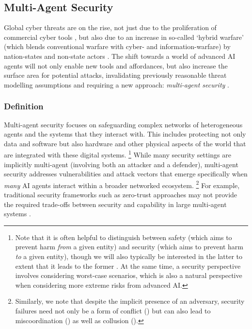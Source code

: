 \subsection{Multi-Agent Security}
\label{sec:multi-agent_security}

Global cyber threats are on the rise, not just due to the proliferation of commercial cyber tools \citep{nscs_threat_2023}, but also due to an increase in so-called `hybrid warfare' (which blends conventional warfare with cyber- and information-warfare) by nation-states and non-state actors \citep{kaunert_cyber-attacks_2021,csis_significant_2023}.
The shift towards a world of advanced AI agents will not only enable new tools and affordances, but also increase the surface area for potential attacks, invalidating previously reasonable threat modelling assumptions and requiring a new approach: \textit{multi-agent security} \citep{masec}.

\subsubsection{Definition}

Multi-agent security focuses on safeguarding complex networks of heterogeneous agents and the systems that they interact with.
This includes protecting not only data and software but also hardware and other physical aspects of the world that are integrated with these digital systems.%
\footnote{Note that it is often helpful to distinguish between safety (which aims to prevent harm \textit{from} a given entity) and security (which aims to prevent harm \textit{to} a given entity), though we will also typically be interested in the latter to extent that it leads to the former \citep{khlaaf2023}.
At the same time, a security perspective involves considering worst-case scenarios, which is also a natural perspective when considering more extreme risks from advanced AI.}
While many security settings are implicitly multi-agent (involving both an attacker and a defender), multi-agent security addresses vulnerabilities and attack vectors that emerge specifically when \textit{many} AI agents interact within a broader networked ecosystem.%
\footnote{Similarly, we note that despite the implicit presence of an adversary, security failures need not only be a form of conflict () but can also lead to miscoordination () as well as collusion ().}
For example, traditional security frameworks such as zero-trust approaches may not provide the required trade-offs between security and capability in large multi-agent systems \citep{wylde_zero_2021}.

